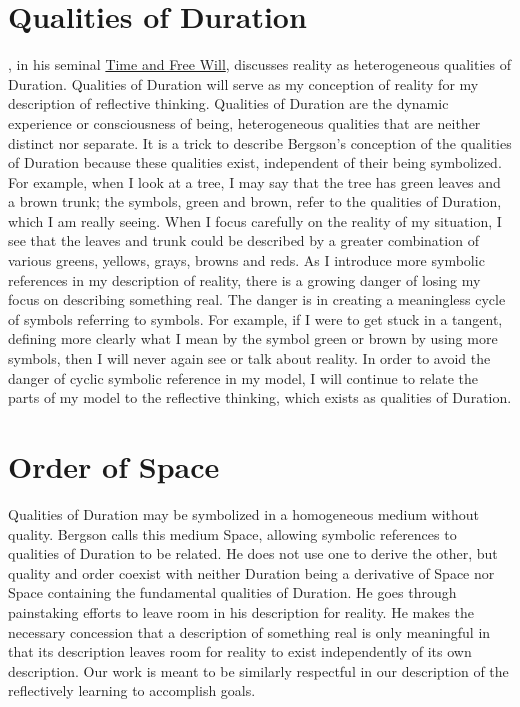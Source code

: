 \section{Qualities of Duration}

\cite{bergson:1910}, in his seminal \underline{Time and Free Will},
discusses reality as heterogeneous qualities of Duration.  Qualities
of Duration will serve as my conception of reality for my description
of reflective thinking.  Qualities of Duration are the dynamic
experience or consciousness of being, heterogeneous qualities that are
neither distinct nor separate.  It is a trick to describe Bergson's
conception of the qualities of Duration because these qualities exist,
independent of their being symbolized.  For example, when I look at a
tree, I may say that the tree has green leaves and a brown trunk; the
symbols, green and brown, refer to the qualities of Duration, which I
am really seeing.  When I focus carefully on the reality of my
situation, I see that the leaves and trunk could be described by a
greater combination of various greens, yellows, grays, browns and
reds.  As I introduce more symbolic references in my description of
reality, there is a growing danger of losing my focus on describing
something real.  The danger is in creating a meaningless cycle of
symbols referring to symbols.  For example, if I were to get stuck in
a tangent, defining more clearly what I mean by the symbol green or
brown by using more symbols, then I will never again see or talk about
reality.  In order to avoid the danger of cyclic symbolic reference in
my model, I will continue to relate the parts of my model to the
reflective thinking, which exists as qualities of Duration.

\section{Order of Space}

Qualities of Duration may be symbolized in a homogeneous medium
without quality.  Bergson calls this medium Space, allowing symbolic
references to qualities of Duration to be related.  He does not use
one to derive the other, but quality and order coexist with neither
Duration being a derivative of Space nor Space containing the
fundamental qualities of Duration.  He goes through painstaking
efforts to leave room in his description for reality.  He makes the
necessary concession that a description of something real is only
meaningful in that its description leaves room for reality to exist
independently of its own description.  Our work is meant to be
similarly respectful in our description of the reflectively learning
to accomplish goals.

